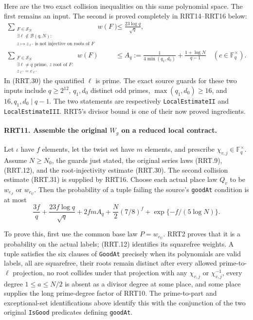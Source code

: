 Here are the two exact collision inequalities on this same
polynomial space.  The first remains an input.  The second
is proved completely in RRT14--RRT16 below:
\begin{align}
 \sum_{\substack{F\in\mathcal S_N\\
   \exists\ell\notin\mathcal B(q,N):\\
   z\mapsto z_{\ell'}\text{ is not injective on roots of }F}}
 w(F)&\le\frac{23\log q}{\sqrt q},                 \tag{RRT.30}\\
 \sum_{\substack{F\in\mathcal S_N\\
   \exists\ell\ne q\text{ prime},\ z\text{ root of }F:\\
                         z_{\ell'}=c_{\ell'}}}w(F)
 &\le A_q:=\frac1{4\min(q_1,d_0)}
                  +\frac{1+\log N}{q-1}\quad(c\in\mathbb F_q^\times).
                                                        \tag{RRT.31}
\end{align}
In (RRT.30) the quantified $\ell$ is prime.  The exact source
guards for these two inputs include $q\ge2^{12}$,
$q_1,d_0$ distinct odd primes, $\max(q_1,d_0)\ge16$, and
$16,q_1,d_0\mid q-1$.  The two statements are respectively
\texttt{LocalEstimateII} and \texttt{LocalEstimateIII}.
RRT5's divisor bound is one of their now proved ingredients.

\paragraph{RRT11. Assemble the original $W_g$ on a reduced local contract.}
\label{claim:RRT11}
Let $\iota$ have $f$ elements, let the twist set have $m$
elements, and prescribe $\chi_{v,j}\in\mathbb F_q^\times$.
Assume $N\ge N_0$, the guards just stated, the original
series laws (RRT.9), (RRT.12), and the root-injectivity
estimate (RRT.30).  The second collision estimate (RRT.31)
is supplied by RRT16.  Choose each actual place law $Q_v$ to be
$w_{e_J}$ or $w_{e_U}$.  Then the probability of a tuple failing
the source's \texttt{goodAt} condition is at most
\[
 \frac{3f}{q}+\frac{23f\log q}{\sqrt q}
       +2fmA_q+\frac N2(7/8)^f
                         +\exp\{-f/(5\log N)\}.
 \tag{RRT.32}
\]

To prove this, first use the common base law $P=w_{e_U}$.
RRT2 proves that it is a probability on the actual labels;
(RRT.12) identifies its squarefree weights.  A tuple satisfies
the six clauses of \texttt{GoodAt} precisely when its
polynomials are valid labels, all are squarefree, their roots
remain distinct after every allowed prime-to-$\ell$ projection,
no root collides under that projection with any
$\chi_{v,j}$ or $\chi_{v,j}^{-1}$, every degree
$1\le a\le N/2$ is absent as a divisor degree at some place,
and some place supplies the long prime-degree factor of RRT10.
The prime-to-part and exceptional-set identifications above
identify this with the conjunction of the two original
\texttt{IsGood} predicates defining \texttt{goodAt}.

